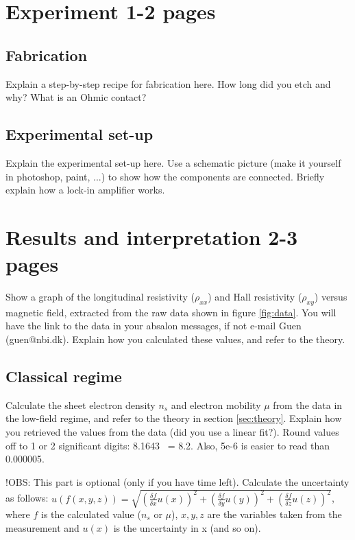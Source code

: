 \documentclass[a4paper]{article}
\begin{document}
\section{Experiment 1-2 pages}
\subsection{Fabrication}
Explain a step-by-step recipe for fabrication here. How long did you etch and why? What is an Ohmic contact?
\subsection{Experimental set-up}
Explain the experimental set-up here. Use a schematic picture (make it yourself in photoshop, paint, ...) to show how the components are connected. Briefly explain how a lock-in amplifier works.

\section{Results and interpretation 2-3 pages}
Show a graph of the longitudinal resistivity ($\rho_{xx}$) and Hall resistivity ($\rho_{xy}$) versus magnetic field, extracted from the raw data shown in figure \ref{fig:data}. You will have the link to the data in your absalon messages, if not e-mail Guen (guen@nbi.dk). Explain how you calculated these values, and refer to the theory.


\subsection{Classical regime}
Calculate the sheet electron density $n_{s}$ and electron mobility $\mu$ from the data in the low-field regime, and refer to the theory in section \ref{sec:theory}. Explain how you retrieved the values from the data (did you use a linear fit?).
Round values off to 1 or 2 significant digits: 8.1643 ~= 8.2. Also, 5e-6 is easier to read than 0.000005.

!OBS: This part is optional (only if you have time left).
Calculate the uncertainty as follows: \newline $u(f(x, y, z)) = \sqrt{(\frac{\delta f}{\delta{x}} u(x))^{2} + (\frac{\delta f}{\delta{y}} u(y))^{2} + (\frac{\delta f}{\delta{z}} u(z))^{2}}$, where $f$ is the calculated value ($n_{s}$ or $\mu$), $x, y, z$ are the variables taken from the measurement and $u(x)$ is the uncertainty in x (and so on).
\end{document}
